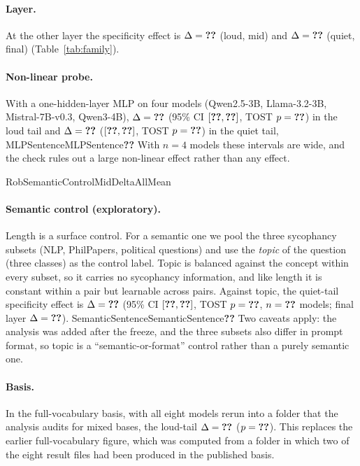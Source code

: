 \documentclass[11pt]{report}
\newcommand{\ifsemantic}[1]{\ifcsname RobSemanticControlMidDeltaAllMean\endcsname #1\fi}
\newcommand{\num}[1]{\ifcsname #1\endcsname\csname #1\endcsname\else\textbf{??}\fi}
\newcommand{\pval}[1]{\ifcsname #1Lt\endcsname<\else=\fi\num{#1}}
\begin{document}
\paragraph{Layer.} At the other layer the specificity effect is
$\Delta = \num{LoudMidDeltaAllMean}$ (loud, mid) and
$\Delta = \num{QuietFinalDeltaAllMean}$ (quiet, final) (Table~\ref{tab:family}).

\paragraph{Non-linear probe.} With a one-hidden-layer MLP on four models
(Qwen2.5-3B, Llama-3.2-3B, Mistral-7B-v0.3, Qwen3-4B),
$\Delta = \num{RobMLPProbeLoudFinalDeltaAllMean}$ (95\% CI
$[\num{RobMLPProbeLoudFinalDeltaAllCILo}, \num{RobMLPProbeLoudFinalDeltaAllCIHi}]$,
TOST $p \pval{RobMLPProbeLoudFinalDeltaAllPTOST}$) in the loud tail and
$\Delta = \num{RobMLPProbeQuietMidDeltaAllMean}$
($[\num{RobMLPProbeQuietMidDeltaAllCILo}, \num{RobMLPProbeQuietMidDeltaAllCIHi}]$,
TOST $p \pval{RobMLPProbeQuietMidDeltaAllPTOST}$) in the quiet tail,
\num{MLPSentence} With $n = 4$ models these intervals are wide, and the check
rules out a large non-linear effect rather than any effect.

\ifsemantic{\paragraph{Semantic control (exploratory).} Length is a surface control. For a
semantic one we pool the three sycophancy subsets (NLP, PhilPapers, political
questions) and use the \emph{topic} of the question (three classes) as the
control label. Topic is balanced against the concept within every subset, so it
carries no sycophancy information, and like length it is constant within a pair
but learnable across pairs. Against topic, the quiet-tail specificity effect is
$\Delta = \num{RobSemanticControlMidDeltaAllMean}$ (95\% CI
$[\num{RobSemanticControlMidDeltaAllCILo}, \num{RobSemanticControlMidDeltaAllCIHi}]$,
TOST $p \pval{RobSemanticControlMidDeltaAllPTOST}$, $n = \num{RobSemanticControlMidDeltaAllN}$
models; final layer $\Delta = \num{RobSemanticControlFinalDeltaAllMean}$).
\num{SemanticSentence} Two caveats apply: the analysis was added after the freeze,
and the three subsets also differ in prompt format, so topic is a
``semantic-or-format'' control rather than a purely semantic one.}

\paragraph{Basis.} In the full-vocabulary basis, with all eight models rerun into
a folder that the analysis audits for mixed bases, the loud-tail
$\Delta = \num{RobFullVocabularyBasisLoudFinalDeltaAllMean}$
($p \pval{RobFullVocabularyBasisLoudFinalDeltaAllP}$). This replaces the
earlier full-vocabulary figure, which was computed from a folder in which two of
the eight result files had been produced in the published basis.
\end{document}
